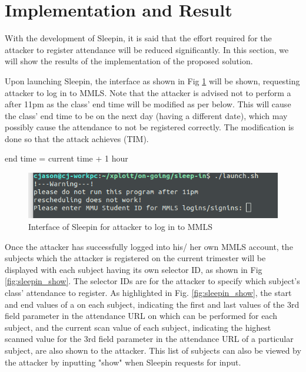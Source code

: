 \documentclass[runningheads]{llncs}
\begin{document}
\section{Implementation and Result}
With the development of Sleepin, it is said that the effort required for the attacker to register attendance will be reduced significantly. In this section, we will show the results of the implementation of the proposed solution.

Upon launching Sleepin, the interface as shown in Fig \ref{fig:sleepin_login} will be shown, requesting attacker to log in to MMLS. Note that the attacker is advised not to perform a \scanattack{} after 11pm as the class' end time will be modified as per below. This will cause the class' end time to be on the next day (having a different date),  which may possibly cause the attendance to not be registered correctly. The modification is done so that the attack achieves (TIM).
\begin{center}
    end time = current time + 1 hour\\
\end{center}

\begin{figure}
\includegraphics[width=\textwidth]{imgres/sleepin_login.png}
\caption{Interface of Sleepin for attacker to log in to MMLS} 
\label{fig:sleepin_login}
\end{figure}

Once the attacker has successfully logged into his/ her own MMLS account, the subjects which the attacker is registered on the current trimester will be displayed with each subject having its own selector ID, as shown in Fig \ref{fig:sleepin_show}. The selector IDs are for the attacker to specify which subject's class' attendance to register. As highlighted in Fig. \ref{fig:sleepin_show}, the start and end values of a \scanattack{} on each subject, indicating the first and last values of the 3rd field parameter in the attendance URL on which \scanattack{} can be performed for each subject, and the current scan value of each subject, indicating the highest scanned value for the 3rd field parameter in the attendance URL of a particular subject, are also shown to the attacker. This list of subjects can also be viewed by the attacker by inputting "show" when Sleepin requests for input. 
\end{document}
